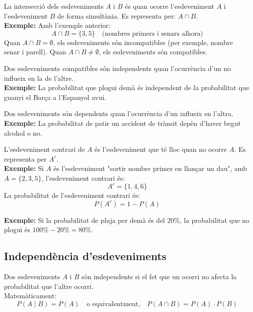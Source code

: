 \documentclass[12pt]{article}
\begin{document}
\begin{concept} [title=Intersecció d'esdeveniments] \noindent La intersecció dels esdeveniments $A$ i $B$ és quan ocorre l'esdeveniment $A$ i l'esdeveniment $B$ de forma simultània. Es representa per: $A \cap B$.  \\

\textbf{Exemple:}  
Amb l'exemple anterior:  
\[
A \cap B = \{3, 5\} \quad \text{(nombres primers i senars alhora)}
\]  
Quan $A \cap B = \emptyset$, els esdeveniments són incompatibles (per exemple, nombre senar i parell).  
Quan $A \cap B \neq \emptyset$, els esdeveniments són compatibles.
\end{concept}

\begin{concept} [title=Esdeveniments dependents] \noindent Dos esdeveniments compatibles són independents quan l'ocurrència d'un no influeix en la de l'altre.  \\

\textbf{Exemple:}  
La probabilitat que plogui demà és independent de la probabilitat que guanyi el Barça a l'Espanyol avui.  

Dos esdeveniments són dependents quan l'ocurrència d'un influeix en l'altra. \\ 

\textbf{Exemple:}  
La probabilitat de patir un accident de trànsit depèn d'haver begut alcohol o no.
\end{concept}

\begin{concept} [title=Esdeveniment contrari]\noindent L'esdeveniment contrari de $A$ és l'esdeveniment que té lloc quan no ocorre $A$. Es representa per $A^c$.  \\

\textbf{Exemple:}  
Si $A$ és l'esdeveniment "sortir nombre primer en llançar un dau", amb $A = \{2, 3, 5\}$, l'esdeveniment contrari és:  
\[
A^c = \{1, 4, 6\}
\]  
La probabilitat de l'esdeveniment contrari és:  
\[
P(A^c) = 1 - P(A)
\]

\textbf{Exemple:}  
Si la probabilitat de pluja per demà és del 20\%, la probabilitat que no plogui és $100\% - 20\% = 80\%$.
\end{concept}

\subsection*{Independència d'esdeveniments}

\begin{concept} [title=Esdeveniments independents] \noindent Dos esdeveniments $A$ i $B$ són independents si el fet que un ocorri no afecta la probabilitat que l'altre ocorri. \\

Matemàticament:  
\[
P(A \mid B) = P(A) \quad \text{o equivalentment,} \quad P(A \cap B) = P(A) \cdot P(B)
\]
\end{concept}
\end{document}
